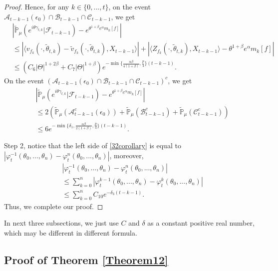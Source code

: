 \documentclass[12pt,oneside,english]{amsart}
\theoremstyle{plain}
\theoremstyle{definition}
\numberwithin{equation}{section}
\begin{document}
\begin{proof}
Hence, for any $k\in\{0,...,t\}$, on the event $\mathcal{A}_{t-k-1}(\epsilon_0)\cap\mathcal{B}_{t-k-1}\cap\mathcal{C}_{t-k-1}$, we get
\begin{align*}
   &\left|\mathbb{\tilde{P}}_{\mu}\left(e^{i\theta \gamma_{t,k}}|\mathcal{F}_{t-k-1}\right)-e^{\theta^{1+\beta}e^{\alpha}m_k[f]}\right|\\
   &\leq \left|\langle v_{f_k}(\cdot,\tilde{\theta}_{t,k})-\tilde{v}_{f_k}(\cdot,\tilde{\theta}_{t,k}), X_{t-k-1}\rangle\right|
   +\left|\langle Z_{f_k}(\cdot,\tilde{\theta}_{t,k}),X_{t-k-1}\rangle-\theta^{1+\beta}e^{\alpha}m_k[f]\right|\\
   &\leq (C_6|\Theta|^{1+2\beta}+C_7|\Theta|^{1+\beta}) e^{-\min\{\frac{\alpha\beta}{4(1+\beta)},\frac{p}{4}\}(t-k-1)}.
\end{align*}
On the event $(\mathcal{A}_{t-k-1}(\epsilon_0)\cap\mathcal{B}_{t-k-1}\cap\mathcal{C}_{t-k-1})^c$, we get
\begin{align*}
    &\left|\mathbb{\tilde{P}}_{\mu}\left(e^{i\theta \gamma_{t,k}}|\mathcal{F}_{t-k-1}\right)-e^{\theta^{1+\beta}e^{\alpha}m_k[f]}\right|\\
    &\leq 2(\mathbb{\tilde{P}}_{\mu}(\mathcal{A}^c_{t-k-1}(\epsilon_0))+\mathbb{\tilde{P}}_{\mu}(\mathcal{B}^c_{t-k-1})+\mathbb{\tilde{P}}_{\mu}(\mathcal{C}^c_{t-k-1}))\\
    &\leq 6e^{-\min\{\delta_1,\frac{\alpha\beta}{2(1+\beta)},\frac{p}{4}\}(t-k-1)}.
\end{align*}

Step 2, notice that the left side of \eqref{32corollary} is equal to $\left|\varphi^{-1}_t(\theta_0,...,\theta_n)-\varphi^{n}_t(\theta_0,...,\theta_n)\right|$, moreover,
\begin{align}
    &\left|\varphi^{-1}_t(\theta_0,...,\theta_n)-\varphi^{n}_t(\theta_0,...,\theta_n)\right|
    \\&\leq\sum_{k=0}^n\left|\varphi^{k-1}_t(\theta_0,...,\theta_n)-\varphi^{k}_t(\theta_0,...,\theta_n)\right|
    \\&\leq \sum_{k=0}^n C_{10} e^{-\delta_3(t-k-1)}.
\end{align}
Thus, we complete our proof.
\end{proof}


In next three subsections, we just use $C$ and $\delta$ as a constant positive real number, which may be different in different formula.
\subsection{Proof of Theorem \ref{Theorem12}}
\end{document}
